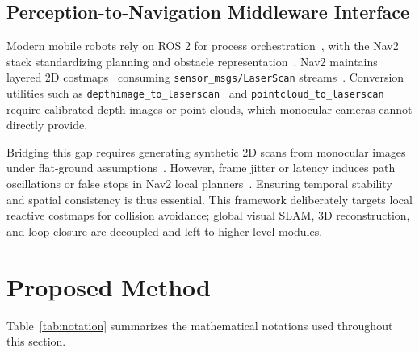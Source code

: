 \documentclass{ieeeaccess}
\begin{document}
\subsection{Perception-to-Navigation Middleware Interface}
Modern mobile robots rely on ROS 2 for process orchestration~\cite{quigley_2009_ros,macenski_2022_robot,wei2025ros}, with the Nav2 stack standardizing planning and obstacle representation~\cite{macenski_2020_the,macenski_2023_from,hu2025improved}. Nav2 maintains layered 2D costmaps~\cite{opennavigationllc_2023_costmap} consuming \texttt{sensor\_msgs/LaserScan} streams~\cite{openrobotics_sensor_msgslaserscan}. Conversion utilities such as \texttt{depthimage\allowbreak\_to\allowbreak\_laserscan}~\cite{openrobotics_2020_depthimage_to_laserscan} and \texttt{pointcloud\allowbreak\_to\allowbreak\_laserscan}~\cite{openrobotics_2015_pointcloud_to_laserscan} require calibrated depth images or point clouds, which monocular cameras cannot directly provide.

Bridging this gap requires generating synthetic 2D scans from monocular images under flat-ground assumptions~\cite{moravec_1985_high,fox_1997_the}. However, frame jitter or latency induces path oscillations or false stops in Nav2 local planners~\cite{fox_1997_the,kobayashi2022local,opennavigationllc_2025_denoise}. Ensuring temporal stability and spatial consistency is thus essential. This framework deliberately targets local reactive costmaps for collision avoidance; global visual SLAM, 3D reconstruction, and loop closure are decoupled and left to higher-level modules.

\section{Proposed Method}
\label{sec:proposed_method}

Table~\ref{tab:notation} summarizes the mathematical notations used throughout this section.
\end{document}
